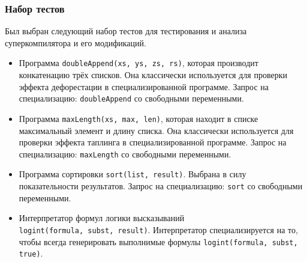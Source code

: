 \subsubsection{Набор тестов}

Был выбран следующий набор тестов для тестирования и анализа суперкомпилятора и его модификаций.
\begin{itemize}
 \item Программа \lstinline{doubleAppend(xs, ys, zs, rs)}, которая
       производит конкатенацию трёх списков. Она классически используется
       для проверки эффекта дефорестации в специализированной программе.
       Запрос на специализацию: \lstinline{doubleAppend} со свободными переменными.
 \item Программа \lstinline{maxLength(xs, max, len)}, которая находит в списке
       максимальный элемент и длину списка. Она классически используется
       для проверки эффекта таплинга в специализированной программе. 
       Запрос на специализацию: \lstinline{maxLength} со свободными переменными.
 \item Программа сортировки \lstinline{sort(list, result)}. Выбрана в силу показательности
       результатов.
       Запрос на специализацию: \lstinline{sort} со свободными переменными.
 \item Интерпретатор формул логики высказываний \\ \lstinline{logint(formula, subst, result)}.
       Интерпретатор специализируется на то, чтобы всегда генерировать выполнимые формулы
       \lstinline{logint(formula, subst, true)}.

\end{itemize}
